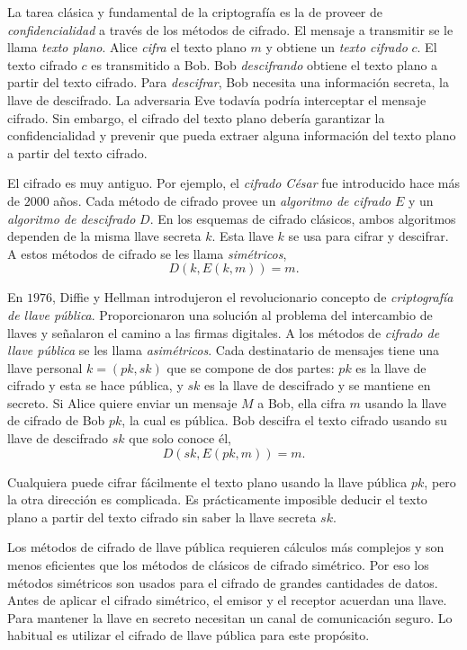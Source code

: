 \documentclass[12pt]{article}
\theoremstyle{definition}
\begin{document}
La tarea clásica y fundamental de la criptografía es la de proveer de \textit{confidencialidad} a través de los métodos de cifrado. El mensaje a transmitir se le llama \textit{texto plano}. Alice \textit{cifra} el texto plano $m$ y obtiene un \textit{texto cifrado} $c$. El texto cifrado $c$ es transmitido a Bob. Bob \textit{descifrando} obtiene el texto plano a partir del texto cifrado. Para \textit{descifrar}, Bob necesita una información secreta, la llave de descifrado. La adversaria Eve todavía podría interceptar el mensaje cifrado. Sin embargo, el cifrado del texto plano debería garantizar la confidencialidad y prevenir que pueda extraer alguna información del texto plano a partir del texto cifrado.

El cifrado es muy antiguo. Por ejemplo, el \textit{cifrado César} fue introducido hace más de $2000$ años. Cada método de cifrado provee un \textit{algoritmo de cifrado} $E$ y un \textit{algoritmo de descifrado} $D$. En los esquemas de cifrado clásicos, ambos algoritmos dependen de la misma llave secreta $k$. Esta llave $k$ se usa para cifrar y descifrar. A estos métodos de cifrado se les llama \textit{simétricos},
$$D(k,E(k,m))=m.$$

En $1976$, Diffie y Hellman introdujeron el revolucionario concepto de \textit{criptografía de llave pública}. Proporcionaron una solución al problema del intercambio de llaves y señalaron el camino a las firmas digitales. A los métodos de \textit{cifrado de llave pública} se les llama \textit{asimétricos}. Cada destinatario de mensajes tiene una llave personal $k = (pk,sk)$ que se compone de dos partes: $pk$ es la llave de cifrado y esta se hace pública, y $sk$ es la llave de descifrado y se mantiene en secreto. Si Alice quiere enviar un mensaje $M$ a Bob, ella cifra $m$ usando la llave de cifrado de Bob $pk$, la cual es pública. Bob descifra el texto cifrado usando su llave de descifrado $sk$ que solo conoce él,
$$D(sk,E(pk,m))=m.$$

Cualquiera puede cifrar fácilmente el texto plano usando la llave pública $pk$, pero la otra dirección es complicada. Es prácticamente imposible deducir el texto plano a partir del texto cifrado sin saber la llave secreta $sk$.

Los métodos de cifrado de llave pública requieren cálculos más complejos y son menos eficientes que los métodos de clásicos de cifrado simétrico. Por eso los métodos simétricos son usados para el cifrado de grandes cantidades de datos. Antes de aplicar el cifrado simétrico, el emisor y el receptor acuerdan una llave. Para mantener la llave en secreto necesitan un canal de comunicación seguro. Lo habitual es utilizar el cifrado de llave pública para este propósito.
\end{document}
